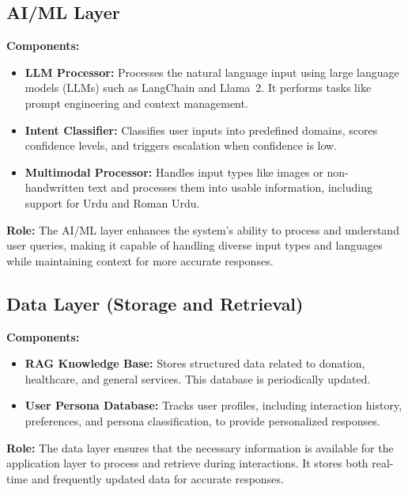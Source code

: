 \subsection{AI/ML Layer}

\textbf{Components:}
\begin{itemize}
    \item \textbf{LLM Processor:} Processes the natural language input using large language models (LLMs) such as LangChain and Llama~2. It performs tasks like prompt engineering and context management.
    \item \textbf{Intent Classifier:} Classifies user inputs into predefined domains, scores confidence levels, and triggers escalation when confidence is low.
    \item \textbf{Multimodal Processor:} Handles input types like images or non-handwritten text and processes them into usable information, including support for Urdu and Roman Urdu.
\end{itemize}

\textbf{Role:} The AI/ML layer enhances the system's ability to process and understand user queries, making it capable of handling diverse input types and languages while maintaining context for more accurate responses.

\subsection{Data Layer (Storage and Retrieval)}

\textbf{Components:}
\begin{itemize}
    \item \textbf{RAG Knowledge Base:} Stores structured data related to donation, healthcare, and general services. This database is periodically updated.
    \item \textbf{User Persona Database:} Tracks user profiles, including interaction history, preferences, and persona classification, to provide personalized responses.
\end{itemize}

\textbf{Role:} The data layer ensures that the necessary information is available for the application layer to process and retrieve during interactions. It stores both real-time and frequently updated data for accurate responses.


